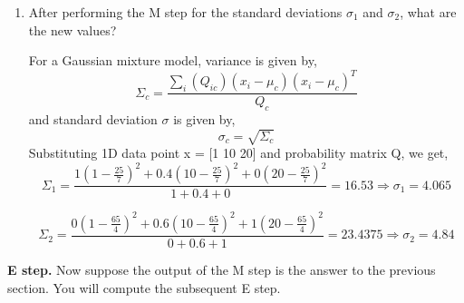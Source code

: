\documentclass{article}
\begin{document}
\begin{enumerate}[label=(\alph*)]
\item After performing the M step for the standard deviations $\sigma_1$ and $\sigma_2$, what are the new values?
\begin{mdframed}[backgroundcolor=lightgray]
For a Gaussian mixture model, variance is given by,
\begin{equation}
\Sigma_c = \frac{\sum_i{(Q_{ic})(x_i-\mu_c)(x_i - \mu_c)^T}}{Q_c}
\end{equation}
and standard deviation $\sigma$ is given by,
\begin{equation}
\sigma_c = \sqrt{\Sigma_c}
\end{equation}
Substituting 1D data point x = [1 10 20] and probability matrix Q, we get,
\begin{equation}
\Sigma_1 = \frac{1(1-\frac{25}{7})^2 + 0.4(10-\frac{25}{7})^2 + 0(20-\frac{25}{7})^2}{1 + 0.4 + 0} = 16.53 \Rightarrow \sigma_1 = 4.065
\end{equation}

\begin{equation}
\Sigma_2 = \frac{0(1-\frac{65}{4})^2+0.6(10-\frac{65}{4})^2+ 1(20-\frac{65}{4})^2}{0 + 0.6 + 1} = 23.4375 \Rightarrow \sigma_2 = 4.84 
\end{equation}
\end{mdframed}

\end{enumerate}

\noindent \textbf{E step.} Now suppose the output of the M step is the answer to the previous section. You will compute the subsequent E step.
\end{document}
